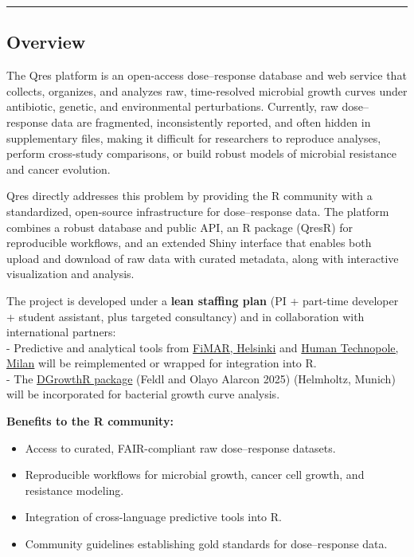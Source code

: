 \documentclass[
  letterpaper,
  DIV=11,
  numbers=noendperiod]{scrartcl}
\providecommand{\tightlist}{%
  \setlength{\itemsep}{0pt}\setlength{\parskip}{0pt}}
\begin{document}
\begin{center}\rule{0.5\linewidth}{0.5pt}\end{center}

\subsection{Overview}\label{overview}

The Qres platform is an open-access dose--response database and web
service that collects, organizes, and analyzes raw, time-resolved
microbial growth curves under antibiotic, genetic, and environmental
perturbations. Currently, raw dose--response data are fragmented,
inconsistently reported, and often hidden in supplementary files, making
it difficult for researchers to reproduce analyses, perform cross-study
comparisons, or build robust models of microbial resistance and cancer
evolution.

Qres directly addresses this problem by providing the R community with a
standardized, open-source infrastructure for dose--response data. The
platform combines a robust database and public API, an R package (QresR)
for reproducible workflows, and an extended Shiny interface that enables
both upload and download of raw data with curated metadata, along with
interactive visualization and analysis.

The project is developed under a \textbf{lean staffing plan} (PI +
part-time developer + student assistant, plus targeted consultancy) and
in collaboration with international partners:\\
- Predictive and analytical tools from
\href{https://www.fimar.fi/}{FiMAR, Helsinki} and
\href{https://humantechnopole.it/en/}{Human Technopole, Milan} will be
reimplemented or wrapped for integration into R.\\
- The \href{https://bio-datascience.github.io/DGrowthR/}{DGrowthR
package} (Feldl and Olayo Alarcon 2025) (Helmholtz, Munich) will be
incorporated for bacterial growth curve analysis.

\textbf{Benefits to the R community:}

\begin{itemize}
\tightlist
\item
  Access to curated, FAIR-compliant raw dose--response datasets.
\item
  Reproducible workflows for microbial growth, cancer cell growth, and
  resistance modeling.
\item
  Integration of cross-language predictive tools into R.
\item
  Community guidelines establishing gold standards for dose--response
  data.
\end{itemize}
\end{document}
